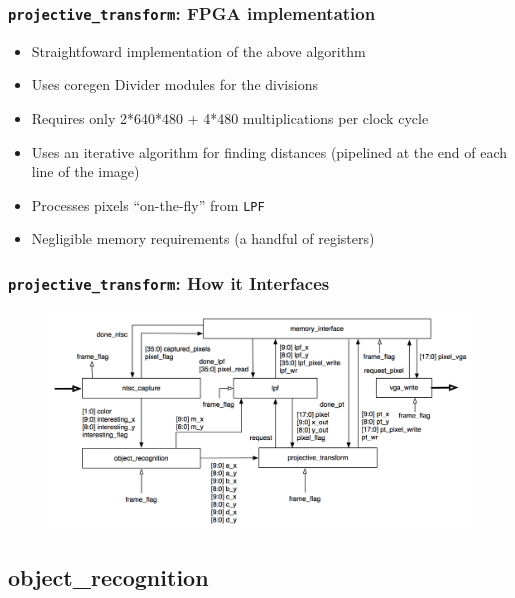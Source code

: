 \documentclass{beamer}
\begin{document}
\begin{frame}
	\frametitle{{\tt projective\_transform}: FPGA implementation}
	\begin{itemize}
	\item Straightfoward implementation of the above algorithm
	\item Uses coregen Divider modules for the divisions
	\item Requires only 2*640*480 + 4*480 multiplications per clock cycle
	\item Uses an iterative algorithm for finding distances (pipelined at the end of each line of the image)
	\item Processes pixels ``on-the-fly'' from {\tt LPF}
	\item Negligible memory requirements (a handful of registers)
	\end{itemize}
\end{frame}


\begin{frame}
	\frametitle{{\tt projective\_transform}: How it Interfaces}
	\begin{figure}
		\centering
		\includegraphics[width=\textwidth]{../proposal/block_diagram_with_wires.png}
	\end{figure}
\end{frame}

\subsection{object\_recognition}
\end{document}
